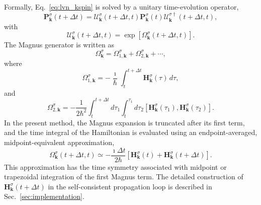 Formally, Eq.~\eqref{eq:lvn_kspin} is solved by a unitary
time-evolution operator,
\begin{equation}
  \mathbf P_{\mathbf k}^{\sigma}(t+\Delta t)
  =
  \mathcal U_{\mathbf k}^{\sigma}(t+\Delta t,t)
  \mathbf P_{\mathbf k}^{\sigma}(t)
  \mathcal U_{\mathbf k}^{\sigma\dagger}(t+\Delta t,t),
  \label{eq:density_unitary_update}
\end{equation}
with
\begin{equation}
  \mathcal U_{\mathbf k}^{\sigma}(t+\Delta t,t)
  =
  \exp\!\left[
    \Omega_{\mathbf k}^{\sigma}(t+\Delta t,t)
  \right].
  \label{eq:magnus_propagator_definition}
\end{equation}
The Magnus generator\cite{Magnus-1954} is written as
\begin{equation}
  \Omega_{\mathbf k}^{\sigma}
  =
  \Omega_{1,\mathbf k}^{\sigma}
  +
  \Omega_{2,\mathbf k}^{\sigma}
  + \cdots,
  \label{eq:magnus_series_kspin}
\end{equation}
where
\begin{equation}
  \Omega_{1,\mathbf k}^{\sigma}
  =
  -
  \frac{\imath}{\hbar}
  \int_t^{t+\Delta t}
  \mathbf H_{\mathbf k}^{\sigma}(\tau)\,d\tau,
  \label{eq:magnus_first_term_kspin}
\end{equation}
and
\begin{equation}
  \Omega_{2,\mathbf k}^{\sigma}
  =
  -
  \frac{1}{2\hbar^2}
  \int_t^{t+\Delta t}d\tau_1
  \int_t^{\tau_1}d\tau_2
  \left[
    \mathbf H_{\mathbf k}^{\sigma}(\tau_1),
    \mathbf H_{\mathbf k}^{\sigma}(\tau_2)
  \right].
  \label{eq:magnus_second_term_kspin}
\end{equation}
In the present method, the Magnus expansion is truncated after its
first term, and the time integral of the Hamiltonian is evaluated using
an endpoint-averaged, midpoint-equivalent approximation,
\begin{equation}
  \Omega_{\mathbf k}^{\sigma}(t+\Delta t,t)
  \simeq
  -
  \frac{\imath\Delta t}{2\hbar}
  \left[
    \mathbf H_{\mathbf k}^{\sigma}(t)
    +
    \mathbf H_{\mathbf k}^{\sigma}(t+\Delta t)
  \right].
  \label{eq:midpoint_magnus_kspin}
\end{equation}
This approximation has the time symmetry associated with midpoint or
trapezoidal integration of the first Magnus term.  The detailed
construction of $\mathbf H_{\mathbf k}^{\sigma}(t+\Delta t)$ in the
self-consistent propagation loop is described in Sec.~\ref{sec:implementation}.

